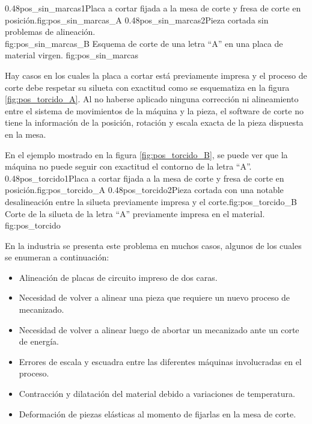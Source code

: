 \subfigab
         {0.48}{pos_sin_marcas1}{Placa a cortar fijada a la mesa de corte y fresa de corte en posición.}{fig:pos_sin_marcas_A}
         {0.48}{pos_sin_marcas2}{Pieza cortada sin problemas de alineación.\\ \vphantom{1}}{fig:pos_sin_marcas_B}
         {Esquema de corte de una letra ``A'' en una placa de material virgen.}
         {fig:pos_sin_marcas}

         Hay casos en los cuales la placa a cortar está previamente impresa y el proceso de corte debe respetar su silueta con exactitud como se esquematiza en la figura \ref{fig:pos_torcido_A}.
         Al no haberse aplicado ninguna corrección ni alineamiento entre el sistema de movimientos de la máquina y la pieza, el software de corte no tiene la información de la posición, rotación y escala exacta de la pieza dispuesta en la mesa. \par
         En el ejemplo mostrado en la figura \ref{fig:pos_torcido_B}, se puede ver que la máquina no puede seguir con exactitud el contorno de la letra ``A''.\\


\subfigab
         {0.48}{pos_torcido1}{Placa a cortar fijada a la mesa de corte y fresa de corte en posición.}{fig:pos_torcido_A}
         {0.48}{pos_torcido2}{Pieza cortada con una notable desalineación entre la silueta previamente impresa y el corte.}{fig:pos_torcido_B}
         {Corte de la silueta de la letra ``A'' previamente impresa en el material.}
         {fig:pos_torcido}

         En la industria se presenta este problema en muchos casos, algunos de los cuales se enumeran a continuación:
\begin{itemize}
   \item{Alineación de placas de circuito impreso de dos caras.}
   \item{Necesidad de volver a alinear una pieza que requiere un nuevo proceso de mecanizado.}
   \item{Necesidad de volver a alinear luego de abortar un mecanizado ante un corte de energía.}
   \item{Errores de escala y escuadra entre las diferentes máquinas involucradas en el proceso.}
   \item{Contracción y dilatación del material debido a variaciones de temperatura.}
   \item{Deformación de piezas elásticas al momento de fijarlas en la mesa de corte.}
\end{itemize}


